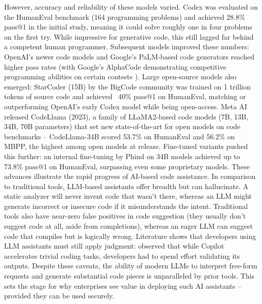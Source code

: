 However, accuracy and reliability of these models varied. Codex was evaluated on the HumanEval benchmark (164 programming problems) and achieved 28.8\% pass@1 in the initial study, meaning it could solve roughly one in four problems on the first try. While impressive for generative code, this still lagged far behind a competent human programmer. Subsequent models improved these numbers: OpenAI’s newer code models and Google’s PaLM-based code generators reached higher pass rates (with Google’s AlphaCode demonstrating competitive programming abilities on certain contests \autocite{Li2022}). Large open-source models also emerged: StarCoder (15B) by the BigCode community was trained on 1 trillion tokens of source code and achieved ~40\% pass@1 on HumanEval​, matching or outperforming OpenAI’s early Codex model while being open-access. Meta AI released CodeLlama (2023), a family of LLaMA2-based code models (7B, 13B, 34B, 70B parameters) that set new state-of-the-art for open models on code benchmarks – CodeLlama-34B scored 53.7\% on HumanEval and 56.2\% on MBPP, the highest among open models at release​. Fine-tuned variants pushed this further: an internal fine-tuning by Phind on 34B models achieved up to 73.8\% pass@1 on HumanEval, surpassing even some proprietary models​. These advances illustrate the rapid progress of AI-based code assistance.
In comparison to traditional tools, LLM-based assistants offer breadth but can hallucinate. A static analyzer will never invent code that wasn’t there, whereas an LLM might generate incorrect or insecure code if it misunderstands the intent. Traditional tools also have near-zero false positives in code suggestion (they usually don’t suggest code at all, aside from completions), whereas an eager LLM can suggest code that compiles but is logically wrong. Literature shows that developers using LLM assistants must still apply judgment: \autocite{Ko2023} observed that while Copilot accelerates trivial coding tasks, developers had to spend effort validating its outputs. Despite these caveats, the ability of modern LLMs to interpret free-form requests and generate substantial code pieces is unparalleled by prior tools. This sets the stage for why enterprises see value in deploying such AI assistants – provided they can be used securely.


